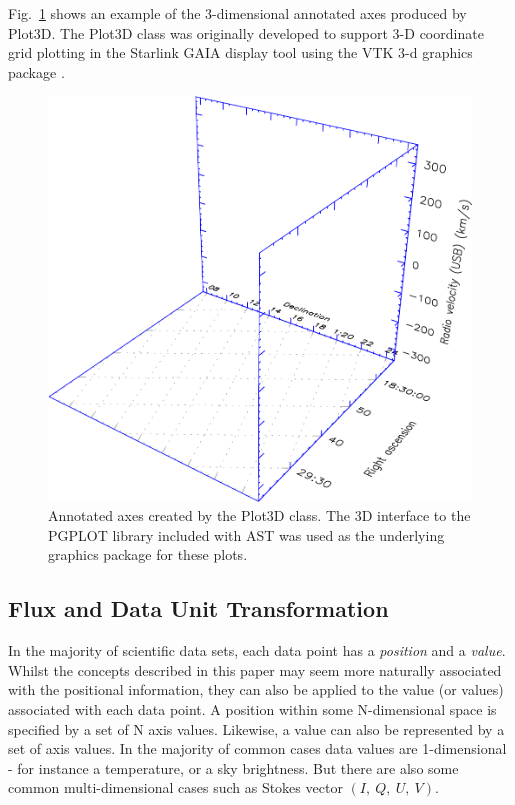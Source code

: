 \documentclass[final,authoryear,5p,times,twocolumn]{elsarticle}
\begin{document}
Fig.~\ref{fig:3dplot} shows an example of the 3-dimensional annotated axes
produced by Plot3D. The Plot3D class was originally developed to
support 3-D coordinate grid plotting in the Starlink GAIA display tool
\citep[][]{2008ASPC..394..339D} using the VTK 3-d graphics
package \citep{Hanwell2015}.

\begin{figure}[h]
\centering
\includegraphics[width=\columnwidth]{3dplot}
\caption{Annotated axes created by the Plot3D class. The 3D interface to the
PGPLOT library included with AST was used as the underlying graphics package
for these plots.}
\label{fig:3dplot}
\end{figure}


\subsection{Flux and Data Unit Transformation}

In the majority of scientific data sets, each data point has a
\emph{position} and a \emph{value}. Whilst the concepts described in this
paper may seem more naturally associated with the positional information,
they can also be applied to the value (or values) associated with each
data point. A position within some N-dimensional space is specified by a
set of N axis values. Likewise, a value can also be represented by a set
of axis values. In the majority of common cases data values are
1-dimensional - for instance a temperature, or a sky brightness. But
there are also some common multi-dimensional cases such as Stokes vector
$(I,~Q,~U,~V)$.
\end{document}
